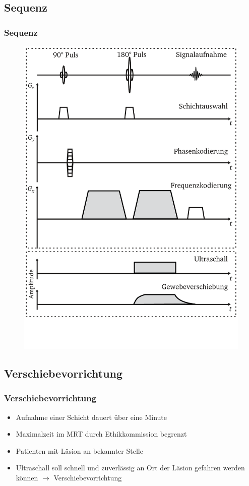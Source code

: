 \documentclass{beamer}
\begin{document}
    \subsection{Sequenz}


	\begin{frame}
		\frametitle{Sequenz}
        \begin{figure}
            \centering
            \includegraphics[width=.45\textwidth]{../Abbildungen/sediffmono.pdf}
        \end{figure}
	\end{frame}

    \subsection{Verschiebevorrichtung}



	\begin{frame}
		\frametitle{Verschiebevorrichtung}
        \begin{itemize}
            \item 
                Aufnahme einer Schicht dauert über eine Minute
            \item
                Maximalzeit im MRT durch Ethikkommission begrenzt
            \item
                Patienten mit Läsion an bekannter Stelle
            \item
                Ultraschall soll schnell und zuverlässig an Ort der Läsion gefahren werden können $\to$ Verschiebevorrichtung
        \end{itemize}
	\end{frame}
\end{document}
